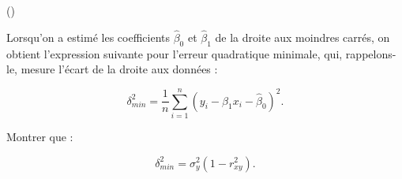 \begin{exercice}\label{exo2-6} (\coolexo)

Lorsqu'on a estim\'e les coefficients $\hat\beta_0$ et $\hat\beta_1$ de la droite aux moindres
carr\'es, on obtient l'expression suivante pour l'erreur quadratique minimale, qui, rappelons-le,
mesure l'\'ecart de la droite aux donn\'ees :

\[ 
\delta^2_{min} = \frac1n \sum_{i=1}^n ( y_i - \hat\beta_1 x_i - \hat\beta_0 )^2.
\]

Montrer que :

\[ 
\delta^2_{min} = \sigma^2_y ( 1 - r^2_{xy} ).
\]

\end{exercice}
